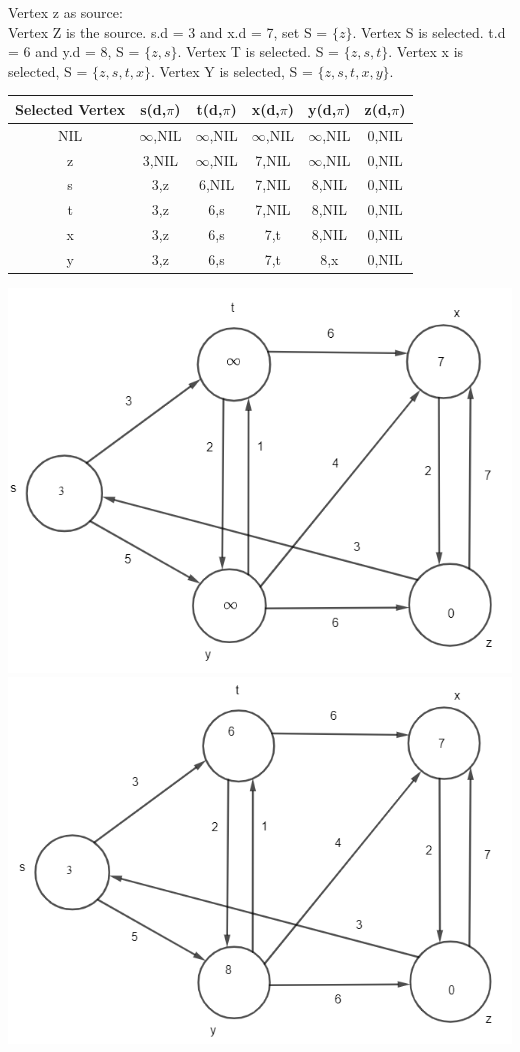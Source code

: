 \documentclass[12pt]{article}
\begin{document}
\begin{enumerate}
Vertex z as source:\\
Vertex Z is the source. s.d = 3  and x.d = 7, set S = $\{z\}$. Vertex S is selected. t.d = 6 and y.d = 8, S = $\{z,s\}$. Vertex T is selected. S = $\{z,s,t\}$. Vertex x is selected, S = $\{z,s,t,x\}$. Vertex Y is selected, S = $\{z,s,t,x,y\}$.
\begin{center}
 \begin{tabular}{|c|c c c c c|} 
 \hline
 Selected Vertex & s(d,$\pi$) & t(d,$\pi$) & x(d,$\pi$) & y(d,$\pi$) & z(d,$\pi$)\\ [0.5ex] 
 \hline
 NIL & $\infty$,NIL & $\infty$,NIL & $\infty$,NIL & $\infty$,NIL & 0,NIL\\ 
 \hline
 z & 3,NIL & $\infty$,NIL & 7,NIL & $\infty$,NIL & 0,NIL\\ 
 \hline
 s & 3,z & 6,NIL & 7,NIL & 8,NIL & 0,NIL \\
 \hline
 t & 3,z & 6,s & 7,NIL & 8,NIL & 0,NIL \\
 \hline
 x & 3,z & 6,s & 7,t & 8,NIL & 0,NIL \\
 \hline
 y & 3,z & 6,s & 7,t & 8,x & 0,NIL \\
 \hline
\end{tabular}
\end{center}
\includegraphics[scale=.65]{24.3-1 Vertex Z/2-1.png}\\
\includegraphics[scale=.65]{24.3-1 Vertex Z/2-2.png}\\

\end{enumerate}
\end{document}
